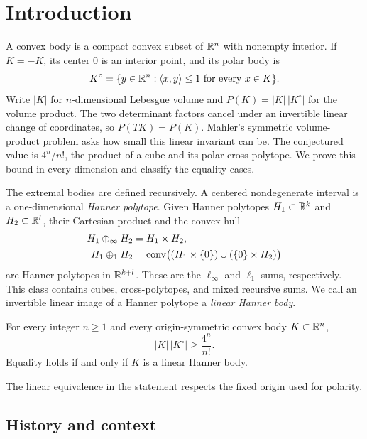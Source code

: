 \section{Introduction}\label{sec:introduction}

A convex body is a compact convex subset of $\mathbb R^n$ with nonempty
interior. If $K=-K$, its center $0$ is an interior point, and its
polar body is
\[
 K^\circ=\{y\in\mathbb R^n:\langle x,y\rangle\le1
                         \text{ for every }x\in K\}.
\]
Write $|K|$ for $n$-dimensional Lebesgue volume and
$P(K)=|K|\,|K^\circ|$ for the volume product. The two determinant
factors cancel under an invertible linear change of coordinates, so
$P(TK)=P(K)$. Mahler's symmetric volume-product problem asks how small
this linear invariant can be. The conjectured value is $4^n/n!$,
the product of a cube and its polar cross-polytope. We prove this bound
in every dimension and classify the equality cases.

The extremal bodies are defined recursively. A centered nondegenerate
interval is a one-dimensional \emph{Hanner polytope}. Given Hanner
polytopes $H_1\subset\mathbb R^k$ and $H_2\subset\mathbb R^l$, their Cartesian
product and the convex hull
\[
 \begin{aligned}
 H_1\oplus_\infty H_2&=H_1\times H_2,\\
 H_1\oplus_1 H_2&=
 \operatorname{conv}\bigl((H_1\times\{0\})\cup(\{0\}\times H_2)\bigr)
 \end{aligned}
\]
are Hanner polytopes in $\mathbb R^{k+l}$. These are the $\ell_\infty$ and
$\ell_1$ sums, respectively. This class contains cubes, cross-polytopes,
and mixed recursive sums. We call an invertible linear image of a
Hanner polytope a \emph{linear Hanner body}.

\begin{theorem}\label{thm:main}
For every integer $n\ge1$ and every origin-symmetric convex body
$K\subset\mathbb R^n$,
\begin{equation}\label{eq:main-inequality}
 |K|\,|K^\circ|\ge\frac{4^n}{n!}.
\end{equation}
Equality holds if and only if $K$ is a linear Hanner body.
\end{theorem}

The linear equivalence in the statement respects the fixed origin
used for polarity.

\subsection{History and context}


